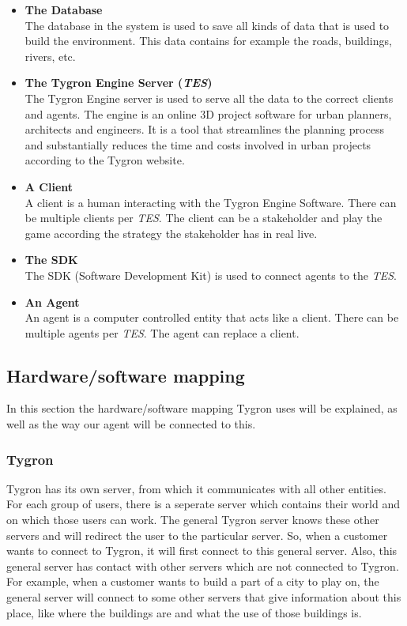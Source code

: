 \begin{itemize}
	\item \textbf{The Database} \\ 
	The database in the system is used to save all kinds of data that is used to build the environment. This data contains for example the roads, buildings, rivers, etc.
	\item \textbf{The Tygron Engine Server (\textit{TES})} \\ 
	The Tygron Engine server is used to serve all the data to the correct clients and agents. The engine is an online 3D project software for urban planners, architects and engineers. It is a tool that streamlines the planning process and substantially reduces the time and costs involved in urban projects according to the Tygron website.
	\item \textbf{A Client} \\
	A client is a human interacting with the Tygron Engine Software. There can be multiple clients per \textit{TES}. The client can be a stakeholder and play the game according the strategy the stakeholder has in real live. 
	\item \textbf{The SDK} \\
	The SDK (Software Development Kit) is used to connect agents to the \textit{TES}.
	\item \textbf{An Agent} \\
	An agent is a computer controlled entity that acts like a client. There can be multiple agents per \textit{TES}. The agent can replace a client.
\end{itemize}

\newpage
\subsection{Hardware/software mapping}
In this section the hardware/software mapping Tygron uses will be explained, as well as the way our agent will be connected to this.

\subsubsection{Tygron}
Tygron has its own server, from which it communicates with all other entities. For each group of users, there is a seperate server which contains their world and on which those users can work. The general Tygron server knows these other servers and will redirect the user to the particular server. So, when a customer wants to connect to Tygron, it will first connect to this general server. Also, this general server has contact with other servers which are not connected to Tygron. For example, when a customer wants to build a part of a city to play on, the general server will connect to some other servers that give information about this place, like where the buildings are and what the use of those buildings is. 

